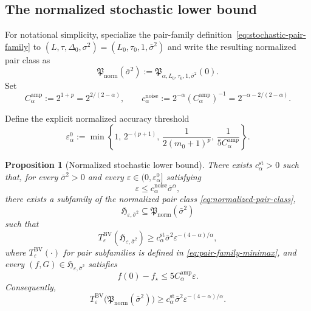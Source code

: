 \documentclass[11pt]{article}
\newtheorem{proposition}[theorem]{Proposition}
\begin{document}
\subsection{The normalized stochastic lower bound}
\label{app:sto-normalized-lb}

For notational simplicity, specialize the pair-family definition~\eqref{eq:stochastic-pair-family} to
\((L,\tau,\Delta_0,\sigma^2)=(L_0,\tau_0,1,\bar\sigma^2)\) and write the resulting normalized pair class as
\begin{equation}
\label{eq:normalized-pair-class}
\mathfrak P_{\mathrm{norm}}(\bar \sigma^2):=\mathfrak P_{\alpha,L_0,\tau_0,1,\bar \sigma^2}(0).
\end{equation}
Set
\[
C_\alpha^{\mathrm{amp}}:=2^{1+p}=2^{2/(2-\alpha)},
\qquad
c_\alpha^{\mathrm{noise}}:=2^{-\alpha}(C_\alpha^{\mathrm{amp}})^{-1}=2^{-\alpha-2/(2-\alpha)}.
\]


Define the explicit normalized accuracy threshold
\begin{equation}
\label{eq:normalized-accuracy-threshold}
\varepsilon_\alpha^0
:=
\min\left\{
1,\,
2^{-(p+1)},\,
\frac{1}{2(m_0+1)^p},\,
\frac{1}{5C_\alpha^{\mathrm{amp}}}
\right\}.
\end{equation}

\begin{proposition}[Normalized stochastic lower bound]
\label{prop:normalized-stochastic-lb}
There exists $c_\alpha^{\mathrm{st}}>0$ such that, for every $\bar \sigma^2>0$ and every
$\varepsilon\in(0,\varepsilon_\alpha^0]$ satisfying
\[
\varepsilon\le c_\alpha^{\mathrm{noise}}\bar \sigma^\alpha,
\]
there exists a subfamily of the normalized pair class \eqref{eq:normalized-pair-class},
\[
\mathfrak H_{\varepsilon,\bar \sigma^2}\subseteq \mathfrak P_{\mathrm{norm}}(\bar \sigma^2)
\]
such that
\[
T_\varepsilon^{\mathrm{BV}}(\mathfrak H_{\varepsilon,\bar \sigma^2})
\ge
c_\alpha^{\mathrm{st}}\bar \sigma^2\varepsilon^{-(4-\alpha)/\alpha},
\]
where \(T_\varepsilon^{\mathrm{BV}}(\cdot)\) for pair subfamilies is defined in
\eqref{eq:pair-family-minimax},
and every $(f,G)\in \mathfrak H_{\varepsilon,\bar \sigma^2}$ satisfies
\[
f(0)-f_\star\le 5C_\alpha^{\mathrm{amp}} \varepsilon.
\]
Consequently,
\[
T_\varepsilon^{\mathrm{BV}}\bigl(\mathfrak P_{\mathrm{norm}}(\bar \sigma^2)\bigr)
\ge
c_\alpha^{\mathrm{st}}\bar \sigma^2\varepsilon^{-(4-\alpha)/\alpha}.
\]
\end{proposition}
\end{document}
